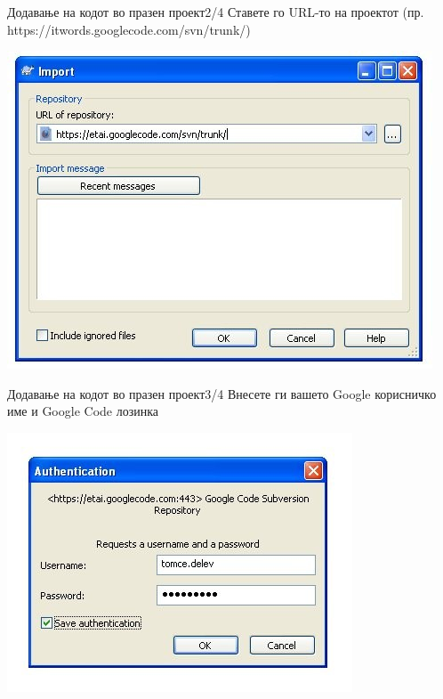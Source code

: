 \begin{frame}{Додавање на кодот во празен проект}{2/4}
Ставете го URL-то на проектот (пр. https://itwords.googlecode.com/svn/trunk/)
\begin{center}
    \includegraphics[scale=0.4]{images/svn_import1.png}
\end{center}
\end{frame}

\begin{frame}{Додавање на кодот во празен проект}{3/4}
Внесете ги вашето Google корисничко име и Google Code лозинка
\begin{center}
    \includegraphics[scale=0.4]{images/auth.png}
\end{center}
\end{frame}


